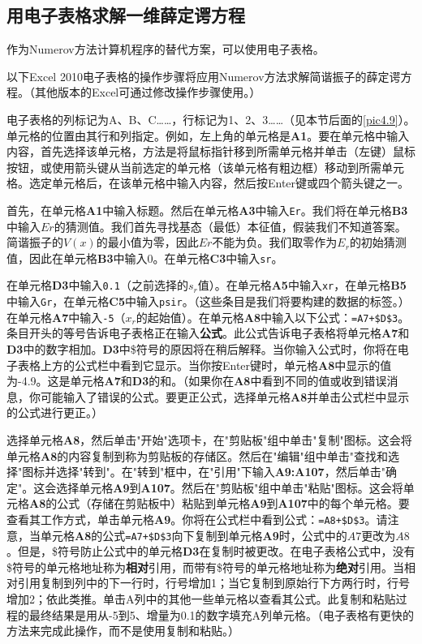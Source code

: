 \documentclass[12pt,a4paper,openany]{ctexbook}
\begin{document}
\subsection{用电子表格求解一维薛定谔方程}
\begin{flushleft}

    \setlength{\parindent}{2em}

作为Numerov方法计算机程序的替代方案，可以使用电子表格。

以下Excel 2010电子表格的操作步骤将应用Numerov方法求解简谐振子的薛定谔方程。（其他版本的Excel可通过修改操作步骤使用。）

电子表格的列标记为A、B、C……，行标记为1、2、3……（见本节后面的\ref{pic4.9}）。单元格的位置由其行和列指定。例如，左上角的单元格是\textbf{A1}。要在单元格中输入内容，首先选择该单元格，方法是将鼠标指针移到所需单元格并单击（左键）鼠标按钮，或使用箭头键从当前选定的单元格（该单元格有粗边框）移动到所需单元格。选定单元格后，在该单元格中输入内容，然后按Enter键或四个箭头键之一。

首先，在单元格\textbf{A1}中输入标题。然后在单元格\textbf{A3}中输入\texttt{Er}。我们将在单元格\textbf{B3}中输入\(Er\)的猜测值。我们首先寻找基态（最低）本征值，假装我们不知道答案。简谐振子的\(V(x)\)的最小值为零，因此\(Er\)不能为负。我们取零作为\(E_r\)的初始猜测值，因此在单元格\textbf{B3}中输入0。在单元格\textbf{C3}中输入\texttt{sr}。

在单元格\textbf{D3}中输入\texttt{0.1}（之前选择的\(s_r\)值）。在单元格\textbf{A5}中输入\texttt{xr}，在单元格\textbf{B5}中输入\texttt{Gr}，在单元格\textbf{C5}中输入\texttt{psir}。（这些条目是我们将要构建的数据的标签。）在单元格\textbf{A7}中输入\texttt{-5}（\(x_r\)的起始值）。在单元格\textbf{A8}中输入以下公式：\texttt{=A7+\$D\$3}。条目开头的等号告诉电子表格正在输入\textbf{公式}。此公式告诉电子表格将单元格\textbf{A7}和\textbf{D3}中的数字相加。\textbf{D3}中\$符号的原因将在稍后解释。当你输入公式时，你将在电子表格上方的公式栏中看到它显示。当你按Enter键时，单元格\textbf{A8}中显示的值为-4.9。这是单元格\textbf{A7}和\textbf{D3}的和。（如果你在\textbf{A8}中看到不同的值或收到错误消息，你可能输入了错误的公式。要更正公式，选择单元格\textbf{A8}并单击公式栏中显示的公式进行更正。）

选择单元格\textbf{A8}，然后单击"开始"选项卡，在"剪贴板"组中单击"复制"图标。这会将单元格\textbf{A8}的内容复制到称为剪贴板的存储区。然后在"编辑"组中单击"查找和选择"图标并选择"转到"。在"转到"框中，在"引用"下输入\textbf{A9:A107}，然后单击"确定"。这会选择单元格\textbf{A9}到\textbf{A107}。然后在"剪贴板"组中单击"粘贴"图标。这会将单元格\textbf{A8}的公式（存储在剪贴板中）粘贴到单元格\textbf{A9}到\textbf{A107}中的每个单元格。要查看其工作方式，单击单元格\textbf{A9}。你将在公式栏中看到公式：\texttt{=A8+\$D\$3}。请注意，当单元格\textbf{A8}的公式\texttt{=A7+\$D\$3}向下复制到单元格\textbf{A9}时，公式中的\(A7\)更改为\(A8\)。但是，\$符号防止公式中的单元格\textbf{D3}在复制时被更改。在电子表格公式中，没有\$符号的单元格地址称为\textbf{相对}引用，而带有\$符号的单元格地址称为\textbf{绝对}引用。当相对引用复制到列中的下一行时，行号增加1；当它复制到原始行下方两行时，行号增加2；依此类推。单击A列中的其他一些单元格以查看其公式。此复制和粘贴过程的最终结果是用从-5到5、增量为0.1的数字填充A列单元格。（电子表格有更快的方法来完成此操作，而不是使用复制和粘贴。）


\end{flushleft}
\end{document}
